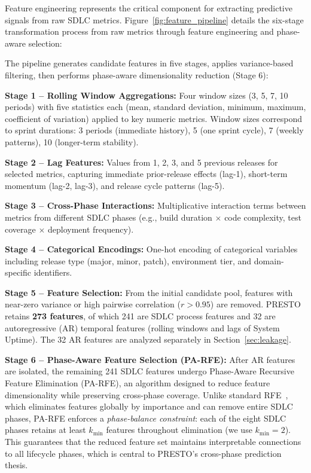 \documentclass[technologies,article,submit,pdftex,moreauthors]{Definitions/mdpi}
\begin{document}
Feature engineering represents the critical component for extracting
predictive signals from raw SDLC metrics.
Figure~\ref{fig:feature_pipeline} details the six-stage
transformation process from raw metrics through feature engineering and
phase-aware selection:

The pipeline generates candidate features in five stages, applies
variance-based filtering, then performs phase-aware dimensionality
reduction (Stage 6):

\textbf{Stage 1 -- Rolling Window Aggregations:} Four window sizes (3,
5, 7, 10 periods) with five statistics each (mean, standard deviation,
minimum, maximum, coefficient of variation) applied to key numeric
metrics. Window sizes correspond to sprint durations: 3 periods
(immediate history), 5 (one sprint cycle), 7 (weekly patterns), 10
(longer-term stability).

\textbf{Stage 2 -- Lag Features:} Values from 1, 2, 3, and 5 previous
releases for selected metrics, capturing immediate prior-release effects
(lag-1), short-term momentum (lag-2, lag-3), and release cycle patterns
(lag-5).

\textbf{Stage 3 -- Cross-Phase Interactions:} Multiplicative interaction
terms between metrics from different SDLC phases (e.g., build duration
\(\times\) code complexity, test coverage \(\times\) deployment
frequency).

\textbf{Stage 4 -- Categorical Encodings:} One-hot encoding of
categorical variables including release type (major, minor, patch),
environment tier, and domain-specific identifiers.

\textbf{Stage 5 -- Feature Selection:} From the initial candidate pool,
features with near-zero variance or high pairwise correlation
(\(r > 0.95\)) are removed. PRESTO retains \textbf{273 features}, of
which 241 are SDLC process features and 32 are autoregressive (AR)
temporal features (rolling windows and lags of System Uptime). The 32 AR
features are analyzed separately in Section~\ref{sec:leakage}.

\textbf{Stage 6 -- Phase-Aware Feature Selection (PA-RFE):} After AR
features are isolated, the remaining 241 SDLC features undergo
Phase-Aware Recursive Feature Elimination (PA-RFE), an algorithm
designed to reduce feature dimensionality while preserving cross-phase
coverage. Unlike standard RFE~\cite{guyon2002}, which eliminates
features globally by importance and can remove entire SDLC phases,
PA-RFE enforces a \emph{phase-balance constraint}: each of the eight
SDLC phases retains at least \(k_{\min}\) features throughout
elimination (we use \(k_{\min} = 2\)). This guarantees that the reduced
feature set maintains interpretable connections to all lifecycle phases,
which is central to PRESTO's cross-phase prediction thesis.
\end{document}
